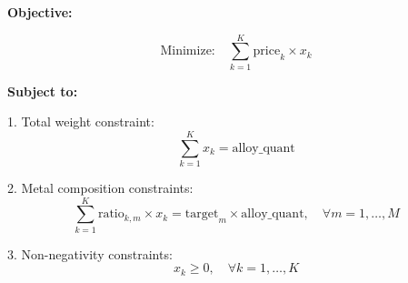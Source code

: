 \documentclass{article}
\begin{document}
\textbf{Objective:}

\[
\text{Minimize:} \quad \sum_{k=1}^{K} \text{price}_k \times x_k
\]

\textbf{Subject to:}

1. Total weight constraint:
\[
\sum_{k=1}^{K} x_k = \text{alloy\_quant}
\]

2. Metal composition constraints:
\[
\sum_{k=1}^{K} \text{ratio}_{k,m} \times x_k = \text{target}_m \times \text{alloy\_quant}, \quad \forall m = 1, \ldots, M
\]

3. Non-negativity constraints:
\[
x_k \geq 0, \quad \forall k = 1, \ldots, K
\]
\end{document}

